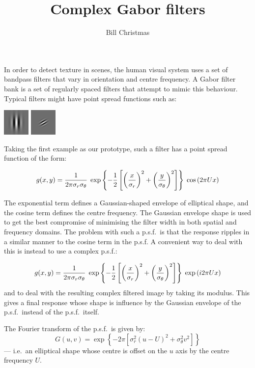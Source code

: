 \documentclass[12pt,a4]{article}
\title{Complex Gabor filters}
\author{Bill Christmas}
\begin{document}
\maketitle

In order to detect texture in scenes, the human visual system uses a set of bandpass filters that vary in orientation and centre frequency.  A Gabor filter bank is a set of regularly spaced filters that attempt to mimic this behaviour.  Typical filters might have point spread functions such as:

\begin{center}
  \includegraphics{psf}  \hspace{2cm} \includegraphics{psf45}
\end{center}

Taking the first example as our prototype, such a filter has a point spread function of the form:

\[ g(x,y) = {1 \over 2 \pi  \sigma_r\sigma_\theta}\;
\exp \left\{ -{1\over2} \left[{\left(x\over\sigma_r\right)^2+\left(y \over \sigma_\theta\right)^2}\right]\right\} \;
\cos\left(2\pi U x\right) \]

The exponential term defines a Gaussian-shaped envelope of elliptical shape, and the cosine term defines the centre frequency.  The Gaussian envelope shape is used to get the best compromise of minimising the filter width in both spatial and frequency domains.  The problem with such a p.s.f.\ is that the response ripples in a similar manner to the cosine term in the p.s.f.  A convenient way to deal with this is instead to use a complex p.s.f.:

\[ g(x,y) = {1 \over 2 \pi  \sigma_r\sigma_\theta}\;
\exp \left\{ -{1\over2} \left[{\left(x\over\sigma_r\right)^2+\left(y \over \sigma_\theta\right)^2}\right]\right\} \;
\exp\left(i2\pi U x\right) \]
and to deal with the resulting complex filtered image by taking its modulus.  This gives a final response whose shape is influence by the Gaussian envelope of the p.s.f.\ instead of the p.s.f.\ itself.

The Fourier transform of the p.s.f.\ is given by:
\begin{equation}
  G(u,v) = \exp \left\{ -2\pi\left[ \sigma_r^2 (u-U)^2 +\sigma_\theta^2 v^2 \right] \right\}\label{eq:G}
\end{equation}
--- i.e.\ an elliptical shape whose centre is offset on the $u$ axis by the centre frequency $U$.
\end{document}
